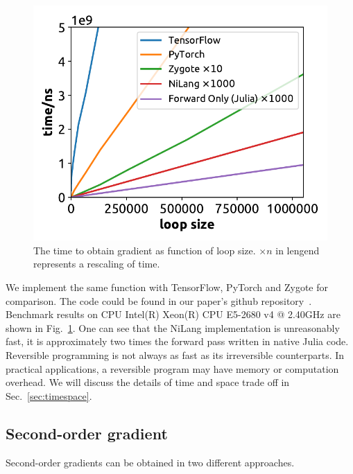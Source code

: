 \documentclass[aps,twocolumn,longbibliography,english,superscriptaddress]{revtex4-1}
\newcommand{\<}{\langle}
\renewcommand{\>}{\rangle}
\newcommand{\Fig}[1]{Fig.~\ref{#1}}
\newcommand{\Sec}[1]{Sec.~\ref{#1}}
\theoremstyle{definition}\newtheorem{definition}{\textit{Definition}}
\begin{document}
\begin{figure}
    \centerline{\includegraphics[width=0.9\columnwidth,trim={0 0cm 0 0},clip]{images/fig3.pdf}}
    \caption{The time to obtain gradient as function of loop size. $\times n$ in lengend represents a rescaling of time.}\label{fig:benchmark}
\end{figure}
We implement the same function with TensorFlow, PyTorch and Zygote for comparison. The code could be found in our paper's github repository~\cite{benchmark}. Benchmark results on CPU Intel(R) Xeon(R) CPU E5-2680 v4 @ 2.40GHz are shown in \Fig{fig:benchmark}.
One can see that the NiLang implementation is unreasonably fast, it is approximately two times the forward pass written in native Julia code.
Reversible programming is not always as fast as its irreversible counterparts. In practical applications, a reversible program may have memory or computation overhead. We will discuss the details of time and space trade off in \Sec{sec:timespace}.

\subsection{Second-order gradient}
Second-order gradients can be obtained in two different approaches.
\end{document}
